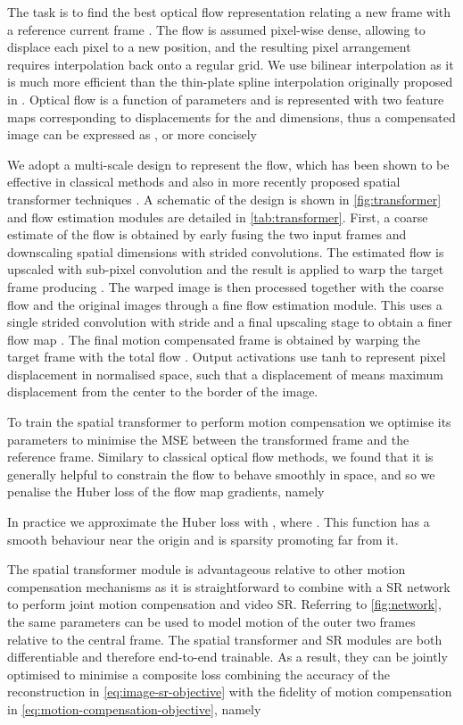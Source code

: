 \documentclass[10pt,twocolumn,letterpaper]{article}
\begin{document}
The task is to find the best optical flow representation relating a new frame  with a reference current frame . The flow is assumed pixel-wise dense, allowing to displace each pixel to a new position, and the resulting pixel arrangement requires interpolation back onto a regular grid. We use bilinear interpolation  as it is much more efficient than the thin-plate spline interpolation originally proposed in \cite{Jaderberg2015}. Optical flow is a function of parameters  and is represented with two feature maps  corresponding to displacements for the  and  dimensions, thus a compensated image can be expressed as , or more concisely


We adopt a multi-scale design to represent the flow, which has been shown to be effective in classical methods \cite{Farneback2003, Brox2004} and also in more recently proposed spatial transformer techniques \cite{Ganin2016, Ahmadi2016, Fischer2015}. A schematic of the design is shown in \cref{fig:transformer} and flow estimation modules are detailed in \cref{tab:transformer}. First, a  coarse estimate of the flow is obtained by early fusing the two input frames and downscaling spatial dimensions with  strided convolutions. The estimated flow is upscaled with sub-pixel convolution and the result  is applied to warp the target frame producing . The warped image is then processed together with the coarse flow and the original images through a fine flow estimation module. This uses a single strided convolution with stride  and a final  upscaling stage to obtain a finer flow map . The final motion compensated frame is obtained by warping the target frame with the total flow . Output activations use tanh to represent pixel displacement in normalised space, such that a displacement of  means maximum displacement from the center to the border of the image.

To train the spatial transformer to perform motion compensation we optimise its parameters  to minimise the \gls{MSE} between the transformed frame and the reference frame. Similary to classical optical flow methods, we found that it is generally helpful to constrain the flow to behave smoothly in space, and so we penalise the Huber loss of the flow map gradients, namely

In practice we approximate the Huber loss with , where . This function has a smooth  behaviour near the origin and is sparsity promoting far from it. 

The spatial transformer module is advantageous relative to other motion compensation mechanisms as it is straightforward to combine with a \gls{SR} network to perform joint motion compensation and video \gls{SR}. Referring to \cref{fig:network}, the same parameters  can be used to model motion of the outer two frames relative to the central frame. The spatial transformer and \gls{SR} modules are both differentiable and therefore end-to-end trainable. As a result, they can be jointly optimised to minimise a composite loss combining the accuracy of the reconstruction in \cref{eq:image-sr-objective} with the fidelity of motion compensation in \cref{eq:motion-compensation-objective}, namely
\end{document}
